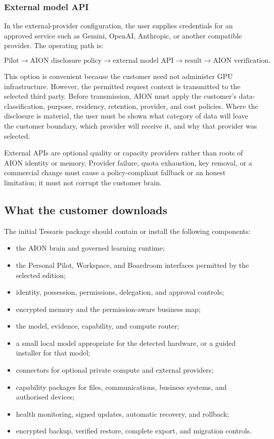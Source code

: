 \subsubsection{External model API}

In the external-provider configuration, the user supplies credentials for an
approved service such as Gemini, OpenAI, Anthropic, or another compatible
provider.  The operating path is:

\[
\text{Pilot}
\rightarrow \text{AION disclosure policy}
\rightarrow \text{external model API}
\rightarrow \text{result}
\rightarrow \text{AION verification}.
\]

This option is convenient because the customer need not administer GPU
infrastructure.  However, the permitted request context is transmitted to the
selected third party.  Before transmission, AION must apply the customer's
data-classification, purpose, residency, retention, provider, and cost policies.
Where the disclosure is material, the user must be shown what category of data
will leave the customer boundary, which provider will receive it, and why that
provider was selected.

External APIs are optional quality or capacity providers rather than roots of
AION identity or memory.  Provider failure, quota exhaustion, key removal, or a
commercial change must cause a policy-compliant fallback or an honest
limitation; it must not corrupt the customer brain.

\subsection{What the customer downloads}

The initial Tessaris package should contain or install the following components:

\begin{itemize}
  \item the AION brain and governed learning runtime;
  \item the Personal Pilot, Workspace, and Boardroom interfaces permitted by
        the selected edition;
  \item identity, possession, permissions, delegation, and approval controls;
  \item encrypted memory and the permission-aware business map;
  \item the model, evidence, capability, and compute router;
  \item a small local model appropriate for the detected hardware, or a guided
        installer for that model;
  \item connectors for optional private compute and external providers;
  \item capability packages for files, communications, business systems, and
        authorised devices;
  \item health monitoring, signed updates, automatic recovery, and rollback;
  \item encrypted backup, verified restore, complete export, and migration
        controls.
\end{itemize}

